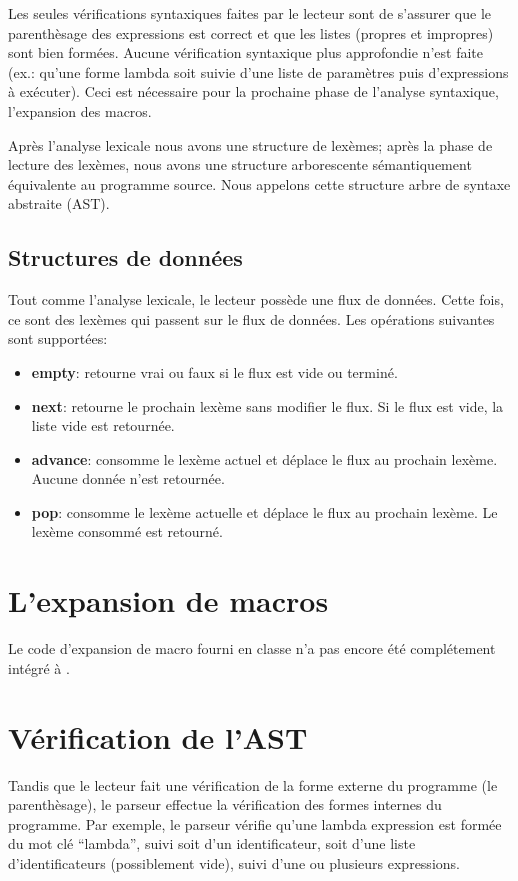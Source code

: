 \documentclass[11pt]{report}
\begin{document}
Les seules vérifications syntaxiques faites par le lecteur sont de s'assurer
que le parenthèsage des expressions est correct et que les listes (propres et
impropres) sont bien formées.  Aucune vérification syntaxique plus approfondie
n'est faite (ex.: qu'une forme lambda soit suivie d'une liste de paramètres
puis d'expressions à exécuter).  Ceci est nécessaire pour la prochaine phase
de l'analyse syntaxique, l'expansion des macros.

Après l'analyse lexicale nous avons une structure de lexèmes; après la phase
de lecture des lexèmes, nous avons une structure arborescente sémantiquement
équivalente au programme source. Nous appelons cette structure arbre de
syntaxe abstraite (AST).

\subsection{Structures de données}

Tout comme l'analyse lexicale, le lecteur possède une flux de
données.  Cette fois, ce sont des lexèmes qui passent sur le flux de
données.  Les opérations suivantes sont supportées:

\begin{itemize}
\item {\bf empty}: retourne vrai ou faux si le flux est vide ou terminé.
\item {\bf next}: retourne le prochain lexème sans modifier le flux.
  Si le flux est vide, la liste vide est retournée.
\item {\bf advance}: consomme le lexème actuel et déplace le flux au
  prochain lexème.  Aucune donnée n'est retournée.
\item {\bf pop}: consomme le lexème actuelle et déplace le flux au
  prochain lexème.  Le lexème consommé est retourné.
\end{itemize}

\section{L'expansion de macros}

Le code d'expansion de macro fourni en classe n'a pas encore été complétement
intégré à \sins{}.

\section{Vérification de l'AST}

Tandis que le lecteur fait une vérification de la forme externe du programme
(le parenthèsage), le parseur effectue la vérification des formes internes du
programme. Par exemple, le parseur vérifie qu'une lambda expression est formée
du mot clé ``lambda'', suivi soit d'un identificateur, soit d'une liste
d'identificateurs (possiblement vide), suivi d'une ou plusieurs expressions.
\end{document}
